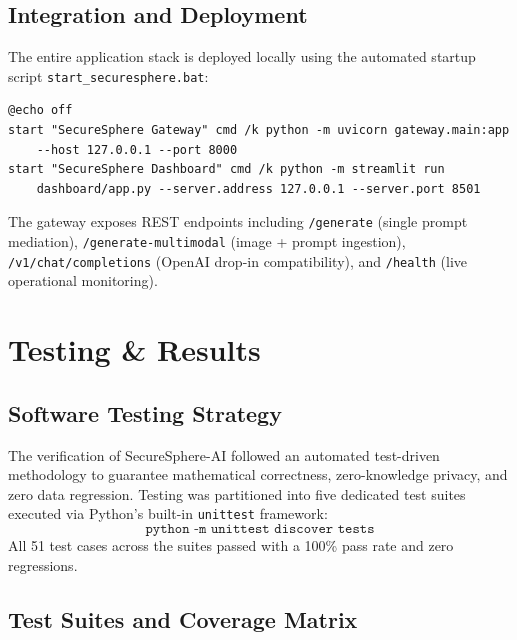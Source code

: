 \documentclass[12pt,a4paper,oneside]{report}
\numberwithin{equation}{chapter}
\begin{document}
\section{Integration and Deployment}
The entire application stack is deployed locally using the automated startup script \texttt{start\_securesphere.bat}:
\begin{verbatim}
@echo off
start "SecureSphere Gateway" cmd /k python -m uvicorn gateway.main:app 
    --host 127.0.0.1 --port 8000
start "SecureSphere Dashboard" cmd /k python -m streamlit run 
    dashboard/app.py --server.address 127.0.0.1 --server.port 8501
\end{verbatim}
The gateway exposes REST endpoints including \texttt{/generate} (single prompt mediation), \texttt{/generate-multimodal} (image + prompt ingestion), \texttt{/v1/chat/completions} (OpenAI drop-in compatibility), and \texttt{/health} (live operational monitoring).

\chapter{Testing \& Results}

\section{Software Testing Strategy}
The verification of SecureSphere-AI followed an automated test-driven methodology to guarantee mathematical correctness, zero-knowledge privacy, and zero data regression. Testing was partitioned into five dedicated test suites executed via Python's built-in \texttt{unittest} framework:
\begin{equation}
\texttt{python -m unittest discover tests}
\end{equation}
All 51 test cases across the suites passed with a 100\% pass rate and zero regressions.

\section{Test Suites and Coverage Matrix}
\end{document}
